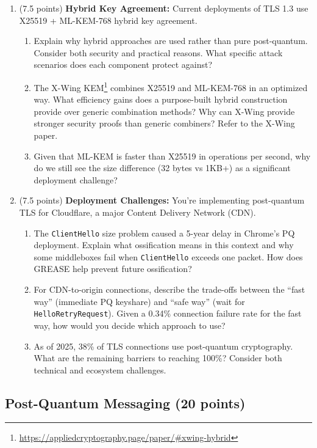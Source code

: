 \documentclass[10pt,a4paper,american]{article}
\begin{document}
\begin{enumerate}
	\item (7.5 points) \textbf{Hybrid Key Agreement:}
	      Current deployments of TLS 1.3 use X25519 + ML-KEM-768 hybrid key agreement.
	      \begin{enumerate}
		      \item Explain why hybrid approaches are used rather than pure post-quantum. Consider both security and practical reasons. What specific attack scenarios does each component protect against?
		      \item The X-Wing KEM\footnote{\url{https://appliedcryptography.page/paper/\#xwing-hybrid}} combines X25519 and ML-KEM-768 in an optimized way. What efficiency gains does a purpose-built hybrid construction provide over generic combination methods? Why can X-Wing provide stronger security proofs than generic combiners? Refer to the X-Wing paper.
		      \item Given that ML-KEM is faster than X25519 in operations per second, why do we still see the size difference (32 bytes vs 1KB+) as a significant deployment challenge?
	      \end{enumerate}
	\item (7.5 points) \textbf{Deployment Challenges:}
	      You're implementing post-quantum TLS for Cloudflare, a major Content Delivery Network (CDN).
	      \begin{enumerate}
		      \item The \texttt{ClientHello} size problem caused a 5-year delay in Chrome's PQ deployment. Explain what ossification means in this context and why some middleboxes fail when \texttt{ClientHello} exceeds one packet. How does GREASE help prevent future ossification?
		      \item For CDN-to-origin connections, describe the trade-offs between the ``fast way'' (immediate PQ keyshare) and ``safe way'' (wait for \texttt{HelloRetryRequest}). Given a 0.34\% connection failure rate for the fast way, how would you decide which approach to use?
		      \item As of 2025, 38\% of TLS connections use post-quantum cryptography. What are the remaining barriers to reaching 100\%? Consider both technical and ecosystem challenges.
	      \end{enumerate}
\end{enumerate}

\subsection{Post-Quantum Messaging (20 points)}
\end{document}
